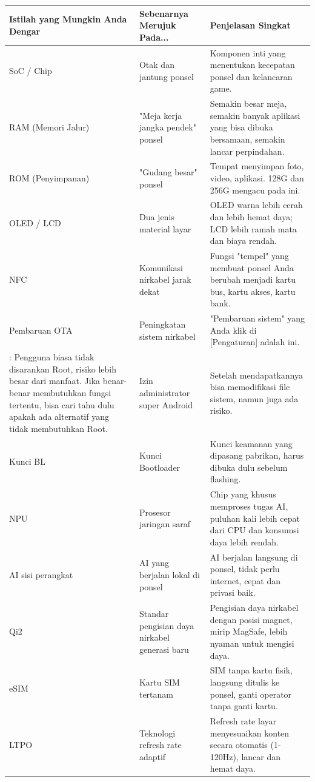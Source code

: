 
\begin{center}
\begin{tabularx}{\linewidth}{|X|X|X|}
\hline
\textbf{Istilah yang Mungkin Anda Dengar} & \textbf{Sebenarnya Merujuk Pada...} & \textbf{Penjelasan Singkat} \tabularnewline
\hline
SoC / Chip & Otak dan jantung ponsel & Komponen inti yang menentukan kecepatan ponsel dan kelancaran game. \tabularnewline
RAM (Memori Jalur) & "Meja kerja jangka pendek" ponsel & Semakin besar meja, semakin banyak aplikasi yang bisa dibuka bersamaan, semakin lancar perpindahan. \tabularnewline
ROM (Penyimpanan) & "Gudang besar" ponsel & Tempat menyimpan foto, video, aplikasi. 128G dan 256G mengacu pada ini. \tabularnewline
OLED / LCD & Dua jenis material layar & OLED warna lebih cerah dan lebih hemat daya; LCD lebih ramah mata dan biaya rendah. \tabularnewline
NFC & Komunikasi nirkabel jarak dekat & Fungsi "tempel" yang membuat ponsel Anda berubah menjadi kartu bus, kartu akses, kartu bank. \tabularnewline
Pembaruan OTA & Peningkatan sistem nirkabel & "Pembaruan sistem" yang Anda klik di [Pengaturan] adalah ini. \tabularnewline
: Pengguna biasa tidak disarankan Root, risiko lebih besar dari manfaat. Jika benar-benar membutuhkan fungsi tertentu, bisa cari tahu dulu apakah ada alternatif yang tidak membutuhkan Root. & Izin administrator super Android & Setelah mendapatkannya bisa memodifikasi file sistem, namun juga ada risiko. \tabularnewline
Kunci BL & Kunci Bootloader & Kunci keamanan yang dipasang pabrikan, harus dibuka dulu sebelum flashing. \tabularnewline
NPU & Prosesor jaringan saraf & Chip yang khusus memproses tugas AI, puluhan kali lebih cepat dari CPU dan konsumsi daya lebih rendah. \tabularnewline
AI sisi perangkat & AI yang berjalan lokal di ponsel & AI berjalan langsung di ponsel, tidak perlu internet, cepat dan privasi baik. \tabularnewline
Qi2 & Standar pengisian daya nirkabel generasi baru & Pengisian daya nirkabel dengan posisi magnet, mirip MagSafe, lebih nyaman untuk mengisi daya. \tabularnewline
eSIM & Kartu SIM tertanam & SIM tanpa kartu fisik, langsung ditulis ke ponsel, ganti operator tanpa ganti kartu. \tabularnewline
LTPO & Teknologi refresh rate adaptif & Refresh rate layar menyesuaikan konten secara otomatis (1-120Hz), lancar dan hemat daya. \tabularnewline
\hline
\end{tabularx}
\end{center}
